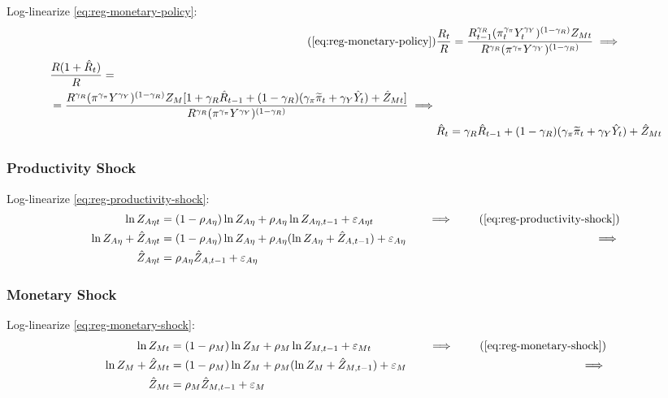 \documentclass[
	thesis.tex
	]{subfiles}
\begin{document}
Log-linearize \ref{eq:reg-monetary-policy}:
\begin{align}
	\tag{\ref{eq:reg-monetary-policy}}
	& \frac{R_t}{R} = \frac{R_{t-1}^{\gamma_R} (\pi_t^{\gamma_\pi} Y_t^{\gamma_Y})^{(1-\gamma_R)} Z_{Mt}}{R^{\gamma_R} (\pi^{\gamma_\pi} Y^{\gamma_Y})^{(1-\gamma_R)}} \implies \\
	\begin{split}
		& \frac{R(1+ \hat{R}_t)}{R} = \\
		&= \frac{ R^{\gamma_R} (\pi^{\gamma_\pi} Y^{\gamma_Y})^{(1-\gamma_R)} Z_{M} [1+ \gamma_R \hat{R}_{t-1} + (1-\gamma_R)(\gamma_\pi \widetilde{\pi}_t + \gamma_Y \hat{Y}_t) + \hat{Z}_{Mt}]}{R^{\gamma_R} (\pi^{\gamma_\pi} Y^{\gamma_Y})^{(1-\gamma_R)}} \implies
	\end{split} \nonumber \\
	& \hat{R}_t = \gamma_R \hat{R}_{t-1} + (1-\gamma_R)(\gamma_\pi \widetilde{\pi}_t + \gamma_Y \hat{Y}_t) + \hat{Z}_{Mt} \label{eq:reg-ll-monetary-policy}
\end{align}


\subsubsection{Productivity Shock}

Log-linearize \ref{eq:reg-productivity-shock}:
\begin{alignat}{2}
	\ln{Z_{A\eta t}} &= (1-\rho_{A\eta})\ln{Z_{A\eta}} + \rho_{A\eta}\ln{Z_{A\eta,t-1}} + \varepsilon_{A\eta t} &\implies \tag{\ref{eq:reg-productivity-shock}} \\
	\ln{Z_{A\eta}} + \hat{Z}_{A\eta t} &= (1-\rho_{A\eta}) \ln{Z_{A\eta}} + \rho_{A\eta} (\ln{Z_{A\eta}} + \hat{Z}_{A,t-1}) + \varepsilon_{A\eta} \quad &\implies \nonumber \\
	\hat{Z}_{A\eta t} &= \rho_{A\eta} \hat{Z}_{A,t-1} + \varepsilon_{A\eta} \label{eq:reg-ll-productivity-shock}
\end{alignat}


\subsubsection{Monetary Shock}

Log-linearize \ref{eq:reg-monetary-shock}:
\begin{alignat}{2}
	\ln{Z_{Mt}} &= (1-\rho_M)\ln{Z_M} + \rho_M\ln{Z_{M,t-1}} + \varepsilon_{Mt} &\implies \tag{\ref{eq:reg-monetary-shock}} \\
	\ln{Z_{M}} + \hat{Z}_{Mt} &= (1-\rho_M) \ln{Z_M} + \rho_M (\ln{Z_{M}} + \hat{Z}_{M,t-1}) + \varepsilon_{M} \quad &\implies \nonumber \\
	\hat{Z}_{Mt} &= \rho_M \hat{Z}_{M,t-1} + \varepsilon_{M} \label{eq:reg-ll-monetary-shock}
\end{alignat}
\end{document}
